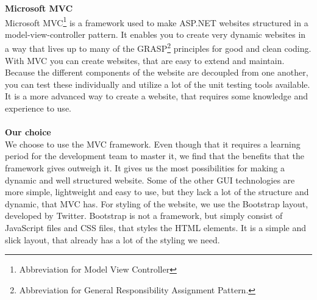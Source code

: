 \documentclass[a4paper,11pt,report]{article}
\begin{document}
{\textbf{Microsoft MVC} \\
Microsoft MVC\footnote{Abbreviation for Model View Controller} is a framework used to make ASP.NET websites structured in a model-view-controller pattern. It enables you to create very dynamic websites in a way that lives up to many of the GRASP\footnote{Abbreviation for General Responsibility Assignment Pattern.} principles for good and clean coding. With MVC you can create websites, that are easy to extend and maintain. Because the different components of the website are decoupled from one another, you can test these individually and utilize a lot of the unit testing tools available. It is a more advanced way to create a website, that requires some knowledge and experience to use. \\ \\

\textbf{Our choice} \\
We choose to use the MVC framework. Even though that it requires a learning period for the development team to master it, we find that the benefits that the framework gives outweigh it.  It gives us the most possibilities for making a dynamic and well structured website. Some of the other GUI technologies are more simple, lightweight and easy to use, but they lack a lot of the structure and dynamic, that MVC has. For styling of the website, we use the Bootstrap layout, developed by Twitter. Bootstrap is not a framework, but simply consist of JavaScript files and CSS files, that styles the HTML elements. It is a simple and slick layout, that already has a lot of the styling we need.

}
\end{document}

